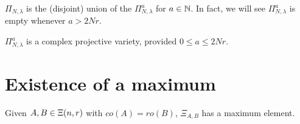 \documentclass[a4paper, 11pt]{report}
\begin{document}
$\Pi_{N,\lambda}$ is the (disjoint) union of the $\Pi_{N,\lambda}^a$ for $a\in\mathbb{N}$. In fact, we will see $\Pi_{N,\lambda}^a$ is empty whenever $a > 2Nr$.

\begin{lemma}
$\Pi_{N,\lambda}^a$ is a complex projective variety, provided $0\le a\le 2Nr$.
\end{lemma}

\section{Existence of a maximum}

\begin{proposition}\label{proposition:existence-maximum}
Given $A,B\in\Xi(n,r)$ with $co(A)=ro(B)$, $\Xi_{A,B}$ has a maximum element.
\end{proposition}
\end{document}
